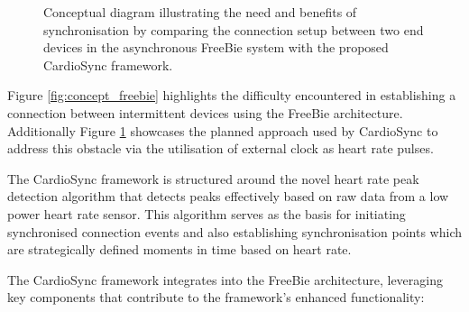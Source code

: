 \begin{figure}[t]
\begin{subfigure}{1\linewidth}
        \label{fig:concept_cardiosync}
    \end{subfigure}
    \caption{Conceptual diagram illustrating the need and benefits of synchronisation by comparing the connection setup between two end devices in the asynchronous FreeBie system with the proposed CardioSync framework.}
    \label{fig:freebie_vs_cardiosync}
\end{figure}
\clearpage

\noindent Figure \ref{fig:concept_freebie} highlights the difficulty encountered in establishing a connection between intermittent devices using the FreeBie architecture. Additionally Figure 
\ref{fig:concept_cardiosync} showcases the planned approach used by CardioSync to address this obstacle via the utilisation of external clock as heart rate pulses.
\vspace{1\baselineskip}

\noindent The CardioSync framework is structured around the novel heart rate peak detection algorithm that detects peaks effectively based on raw data from a low power heart rate sensor. This algorithm serves as the basis for initiating synchronised connection events and also establishing synchronisation points which are strategically defined moments in time based on heart rate.
\vspace{1\baselineskip}

\noindent The CardioSync framework integrates into the FreeBie architecture, leveraging key components that contribute to the framework's enhanced functionality:

